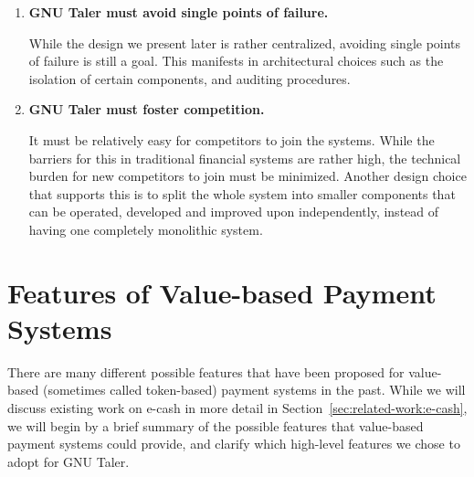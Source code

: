 \begin{enumerate}
  \item \textbf{GNU Taler must avoid single points of failure.}

    While the design we present later is rather centralized, avoiding single
    points of failure is still a goal.  This manifests in architectural choices such as
    the isolation of certain components, and auditing procedures.

  \item \textbf{GNU Taler must foster competition.}

    It must be relatively easy for competitors to join the systems.  While the
    barriers for this in traditional financial systems are rather high, the
    technical burden for new competitors to join must be minimized. Another
    design choice that supports this is to split the whole system into smaller
    components that can be operated, developed and improved upon independently,
    instead of having one completely monolithic system.

\end{enumerate}



\section{Features of Value-based Payment Systems}\label{sec:intro:features}

There are many different possible features that have been proposed for
value-based (sometimes called token-based) payment systems in the past.  While we
will discuss existing work on e-cash in more detail in
Section~\ref{sec:related-work:e-cash}, we will begin by a brief
summary of the possible features that value-based payment systems
could provide, and clarify which high-level features we chose to adopt
for GNU Taler.


%

